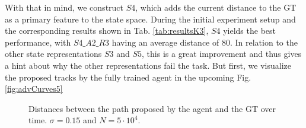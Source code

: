 \par
With that in mind, we construct $S4$, which adds the current distance to the GT as a primary feature to the state space. During the initial experiment setup and the corresponding results shown in Tab. \ref{tab:resultsK3}, $S4$ yields the best performance, with $S4\_A2\_R3$ having an average distance of 80. In relation to the other state representations $S3$ and $S5$, this is a great improvement and thus gives a hint about why the other representations fail the task. But first, we visualize the proposed tracks by the fully trained agent in the upcoming Fig. \ref{fig:advCurves5}

\begin{figure}[H]
     \centering
         
        \caption{Distances between the path proposed by the agent and the GT over time. $\sigma = 0.15$ and $N=5\cdot 10^4$.}
        \label{fig:advCurves4}
\end{figure}


